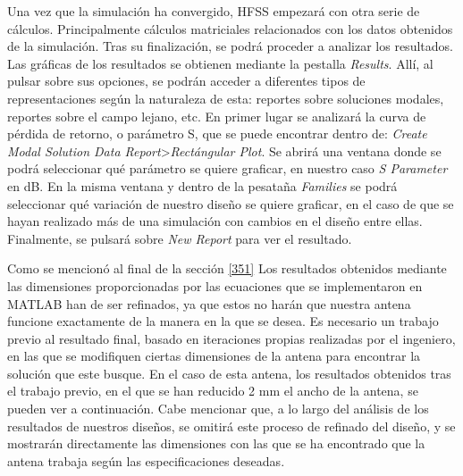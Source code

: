 \par Una vez que la simulación ha convergido, HFSS empezará con otra serie de cálculos. Principalmente cálculos matriciales relacionados con los datos obtenidos de la simulación. Tras su finalización, se podrá proceder a analizar los resultados. Las gráficas de los resultados se obtienen mediante la pestalla \textit{Results}. Allí, al pulsar sobre sus opciones, se podrán acceder a diferentes tipos de representaciones según la naturaleza de esta: reportes sobre soluciones modales, reportes sobre el campo lejano, etc. En primer lugar se analizará la curva de pérdida de retorno, o parámetro S, que se puede encontrar dentro de: \textit{Create Modal Solution Data Report}>\textit{Rectángular Plot}. Se abrirá una ventana donde se podrá seleccionar qué parámetro se quiere graficar, en nuestro caso \textit{S Parameter} en dB. En la misma ventana y dentro de la pesataña \textit{Families} se podrá seleccionar qué variación de nuestro diseño se quiere graficar, en el caso de que se hayan realizado más de una simulación con cambios en el diseño entre ellas. Finalmente, se pulsará sobre \textit{New Report} para ver el resultado.
\\
\par Como se mencionó al final de la sección \ref{351} Los resultados obtenidos mediante las dimensiones proporcionadas por las ecuaciones que se implementaron en MATLAB han de ser refinados, ya que estos no harán que nuestra antena funcione exactamente de la manera en la que se desea. Es necesario un trabajo previo al resultado final, basado en iteraciones propias realizadas por el ingeniero, en las que se modifiquen ciertas dimensiones de la antena para encontrar la solución que este busque. En el caso de esta antena, los resultados obtenidos tras el trabajo previo, en el que se han reducido 2 mm el ancho de la antena, se pueden ver a continuación. Cabe mencionar que, a lo largo del análisis de los resultados de nuestros diseños, se omitirá este proceso de refinado del diseño, y se mostrarán directamente las dimensiones con las que se ha encontrado que la antena trabaja según las especificaciones deseadas.
\\
